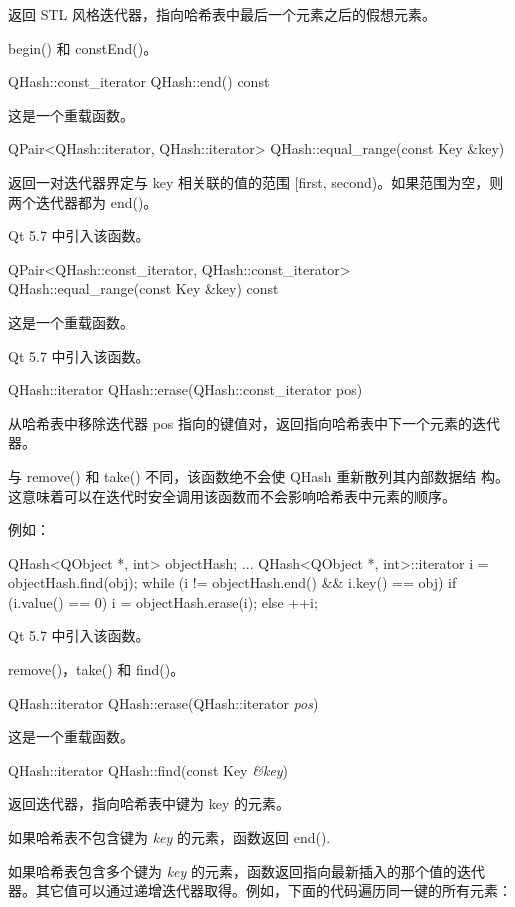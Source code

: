 返回 STL 风格迭代器，指向哈希表中最后一个元素之后的假想元素。

\begin{seeAlso}
begin() 和 constEnd()。
\end{seeAlso}

QHash::const\_iterator QHash::end() const

这是一个重载函数。

QPair<QHash::iterator, QHash::iterator> QHash::equal\_range(const Key \&key)

返回一对迭代器界定与 key 相关联的值的范围 [first, second)。如果范围为空，则两个迭代器都为 end()。

Qt 5.7 中引入该函数。

QPair<QHash::const\_iterator, QHash::const\_iterator> QHash::equal\_range(const Key \&key) const

这是一个重载函数。

Qt 5.7 中引入该函数。

QHash::iterator QHash::erase(QHash::const\_iterator pos)

从哈希表中移除迭代器 pos 指向的键值对，返回指向哈希表中下一个元素的迭代器。

与 remove() 和 take() 不同，该函数绝不会使 QHash 重新散列其内部数据结
构。这意味着可以在迭代时安全调用该函数而不会影响哈希表中元素的顺序。

例如：

\begin{cppcode}
QHash<QObject *, int> objectHash;
...
QHash<QObject *, int>::iterator i = objectHash.find(obj);
while (i != objectHash.end() && i.key() == obj) {
    if (i.value() == 0) {
        i = objectHash.erase(i);
    } else {
        ++i;
    }
}
\end{cppcode}

Qt 5.7 中引入该函数。

\begin{seeAlso}
remove()，take() 和 find()。
\end{seeAlso}

QHash::iterator QHash::erase(QHash::iterator \emph{pos})

这是一个重载函数。

QHash::iterator QHash::find(const Key \emph{\&key})

返回迭代器，指向哈希表中键为 key 的元素。

如果哈希表不包含键为 \emph{key} 的元素，函数返回 end().

如果哈希表包含多个键为 \emph{key} 的元素，函数返回指向最新插入的那个值的迭代器。其它值可以通过递增迭代器取得。例如，下面的代码遍历同一键的所有元素：

